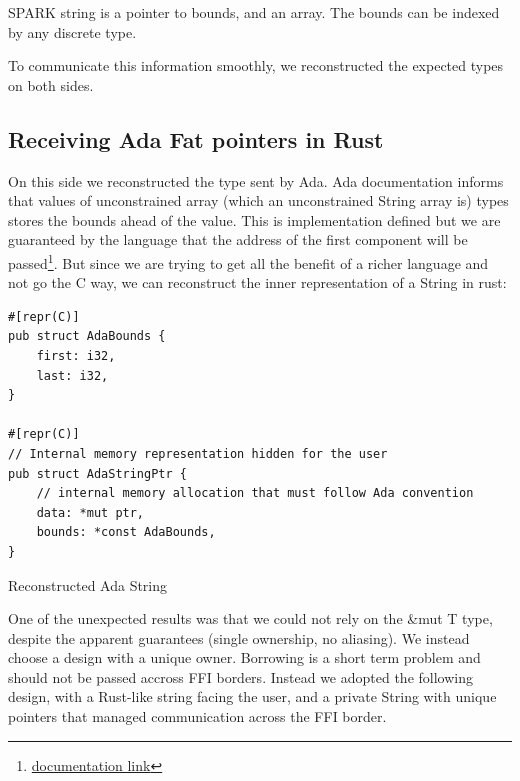 \documentclass[nomenclature, english, bibtex]{kththesis}
\begin{document}
SPARK string is a pointer to bounds, and an array. The bounds can be indexed by any discrete type.

To communicate this information smoothly, we reconstructed the expected types on both sides.

\subsection{Receiving Ada Fat pointers in Rust}

On this side we reconstructed the type sent by Ada. Ada documentation informs that values of unconstrained array (which an unconstrained String array is) types stores the bounds ahead of the value. This is implementation defined but we are guaranteed by the language that the address of the first component will be passed{\footnote{\href{https://learn.adacore.com/courses/intro-to-embedded-sys-prog/chapters/multi_language_development.html}{documentation link}}}. But since we are trying to get all the benefit of a richer language and not go the C way, we can reconstruct the inner representation of a String in rust:

\begin{listing}[!ht]
\begin{verbatim}
#[repr(C)]
pub struct AdaBounds {
    first: i32,
    last: i32,
}

#[repr(C)]
// Internal memory representation hidden for the user
pub struct AdaStringPtr {
    // internal memory allocation that must follow Ada convention
    data: *mut ptr,
    bounds: *const AdaBounds,
}
\end{verbatim}
\caption[Reconstructed Ada String]{Reconstructed Ada String}
\label{lst:reconstructed_ada_string}
\end{listing}

One of the unexpected results was that we could not rely on the \&mut T type, despite the apparent guarantees (single ownership, no aliasing). We instead choose a design with a unique owner. Borrowing is a short term problem and should not be passed accross FFI borders. Instead we adopted the following design, with a Rust-like string facing the user, and a private String with unique pointers that managed communication across the FFI border.
\end{document}
